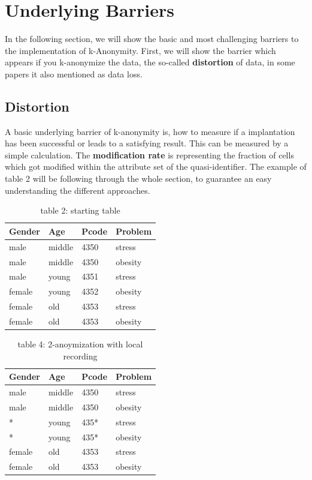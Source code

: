 \documentclass{llncs}
\begin{document}
\section{Underlying Barriers}

In the following section, we will show the basic and most challenging barriers to the implementation of k-Anonymity. First, we will show the barrier which appears if you k-anonymize the data, the so-called \textbf{distortion} of data, in some papers it also mentioned as data loss. 
\subsection{Distortion} 
A basic underlying barrier of k-anonymity is, how to measure if a implantation has been successful or leads to a satisfying result. This can be measured by a simple calculation. The \textbf{modification rate} is representing the fraction of cells which got modified within the attribute set of the quasi-identifier. The example of table 2 will be following through the whole section, to guarantee an easy understanding the different approaches. 
\begin{table}[]
	\centering
	\caption{table 2: starting table}
	\label{table2}
	\begin{tabular}{@{}llll@{}}
		\toprule
		Gender & Age    & Pcode & Problem \\ \midrule
		male   & middle & 4350  & stress  \\
		male   & middle & 4350  & obesity \\
		male   & young  & 4351  & stress  \\
		female & young  & 4352  & obesity \\
		female & old    & 4353  & stress  \\
		female & old    & 4353  & obesity \\ \bottomrule
	\end{tabular}
\end{table}
\begin{table}[]
	\centering
	\caption{table 4: 2-anoymization with local recording}
	\label{table3}
	\begin{tabular}{@{}llll@{}}
		\toprule
		Gender & Age    & Pcode & Problem \\ \midrule
		male   & middle & 4350  & stress  \\
		male   & middle & 4350  & obesity \\
		*      & young  & 435*  & stress  \\
		*      & young  & 435*  & obesity \\
		female & old    & 4353  & stress  \\
		female & old    & 4353  & obesity
	\end{tabular}
\end{table}
\end{document}
